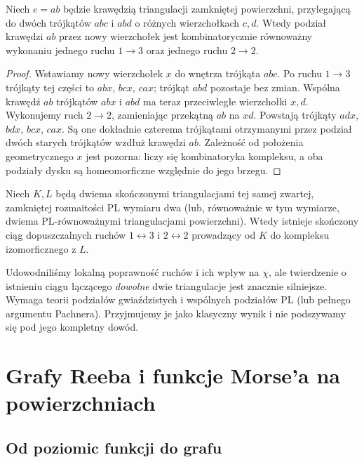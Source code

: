 \begin{stwierdzenie}
Niech $e=ab$ będzie krawędzią triangulacji zamkniętej
powierzchni, przylegającą do dwóch trójkątów $abc$
i $abd$ o różnych wierzchołkach $c,d$. Wtedy podział krawędzi $ab$ przez nowy wierzchołek
jest kombinatorycznie równoważny wykonaniu jednego
ruchu $1\to3$ oraz jednego ruchu $2\to2$.
\end{stwierdzenie}

\begin{proof}
Wstawiamy nowy wierzchołek $x$ do wnętrza trójkąta $abc$.
Po ruchu $1\to3$ trójkąty tej części to $abx$, $bcx$, $cax$;
trójkąt $abd$ pozostaje bez zmian. Wspólna krawędź $ab$
trójkątów $abx$ i $abd$ ma teraz przeciwległe wierzchołki
$x,d$. Wykonujemy ruch $2\to2$, zamieniając przekątną
$ab$ na $xd$. Powstają trójkąty $adx$, $bdx$, $bcx$, $cax$.
Są one dokładnie czterema trójkątami otrzymanymi przez
podział dwóch starych trójkątów wzdłuż krawędzi $ab$.
Zależność od położenia geometrycznego $x$ jest pozorna:
liczy się kombinatoryka kompleksu, a oba podziały
dysku są homeomorficzne względnie do jego brzegu.
\end{proof}

\begin{twierdzenie}
Niech $K,L$ będą dwiema skończonymi triangulacjami
tej samej zwartej, zamkniętej rozmaitości PL
wymiaru dwa (lub, równoważnie w tym wymiarze,
dwiema PL-równoważnymi triangulacjami powierzchni).
Wtedy istnieje skończony ciąg dopuszczalnych ruchów
$1\leftrightarrow3$ i $2\leftrightarrow2$ prowadzący
od $K$ do kompleksu izomorficznego z $L$.
\end{twierdzenie}

\begin{uwaga}
Udowodniliśmy lokalną poprawność ruchów i ich wpływ na
$\chi$, ale twierdzenie o istnieniu ciągu łączącego
\emph{dowolne} dwie triangulacje jest znacznie silniejsze.
Wymaga teorii podziałów gwiaździstych i wspólnych
podziałów PL (lub pełnego argumentu Pachnera).
Przyjmujemy je jako klasyczny wynik i nie podszywamy
się pod jego kompletny dowód.
\end{uwaga}

\chapter{Grafy Reeba i funkcje Morse'a na powierzchniach}
\label{ch:tg-reeb}

\section{Od poziomic funkcji do grafu}
\label{sec:tg-reeb-def}

